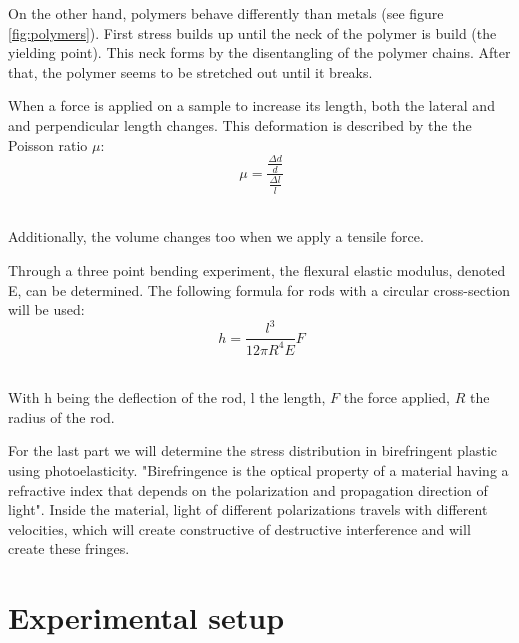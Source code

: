 \documentclass{scrartcl}
\begin{document}
On the other hand, polymers behave differently than metals (see figure \ref{fig:polymers}). First stress builds up until the neck of the polymer is build (the yielding point). This neck forms by the disentangling of the polymer chains. After that, the polymer seems to be stretched out until it breaks.\vspace{0,5cm}

When a force is applied on a sample to increase its length, both the lateral and and perpendicular length changes. This deformation is described by the the Poisson ratio $\mu$:
\[\ \mu = \frac{\frac{\Delta d}{d}}{\frac{\Delta l}{l}} \]\

Additionally, the volume changes too when we apply a tensile force. \vspace{0,5cm}

Through a three point bending experiment, the flexural elastic modulus, denoted E, can be determined. The following formula for rods with a circular cross-section will be used:
\[\ h = \frac{l^3}{12 \pi R^4 E}F \]\

With h being the deflection of the rod, l the length, $F$ the force applied, $R$ the radius of the rod.

For the last part we will determine the stress distribution in birefringent plastic using photoelasticity. "Birefringence is the optical property of a material having a refractive index that depends on the polarization and propagation direction of light"\cite{birefringence}. Inside  the material, light of different polarizations travels with different velocities, which will create constructive of destructive interference and will create these fringes. 

\section{Experimental setup}
\end{document}
